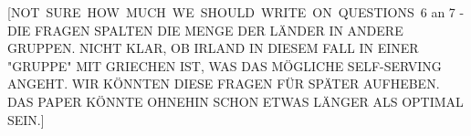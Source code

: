 [NOT\ SURE\ HOW\ MUCH\ WE\ SHOULD\ WRITE\ ON\ QUESTIONS\ 6 an 7 - DIE FRAGEN
SPALTEN DIE MENGE DER L\"{A}NDER IN ANDERE GRUPPEN. NICHT KLAR, OB IRLAND IN
DIESEM FALL IN EINER "GRUPPE" MIT GRIECHEN IST, WAS DAS M\"{O}GLICHE
SELF-SERVING ANGEHT. WIR K\"{O}NNTEN DIESE FRAGEN F\"{U}R SP\"{A}TER
AUFHEBEN. DAS PAPER K\"{O}NNTE OHNEHIN SCHON ETWAS L\"{A}NGER ALS OPTIMAL
SEIN.]